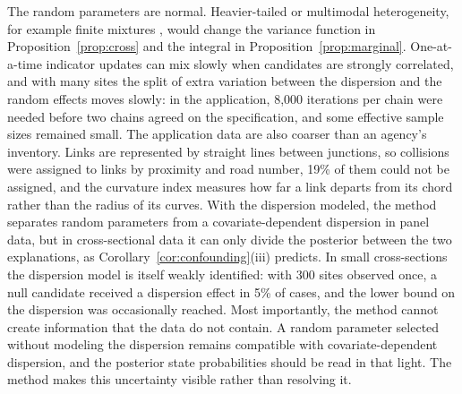 The random parameters are normal. Heavier-tailed or multimodal heterogeneity, for example finite mixtures \citep{buddhavarapu2016modeling}, would change the variance function in Proposition~\ref{prop:cross} and the integral in Proposition~\ref{prop:marginal}. One-at-a-time indicator updates can mix slowly when candidates are strongly correlated, and with many sites the split of extra variation between the dispersion and the random effects moves slowly: in the application, 8{,}000 iterations per chain were needed before two chains agreed on the specification, and some effective sample sizes remained small. The application data are also coarser than an agency's inventory. Links are represented by straight lines between junctions, so collisions were assigned to links by proximity and road number, 19\% of them could not be assigned, and the curvature index measures how far a link departs from its chord rather than the radius of its curves. With the dispersion modeled, the method separates random parameters from a covariate-dependent dispersion in panel data, but in cross-sectional data it can only divide the posterior between the two explanations, as Corollary~\ref{cor:confounding}(iii) predicts. In small cross-sections the dispersion model is itself weakly identified: with 300 sites observed once, a null candidate received a dispersion effect in 5\% of cases, and the lower bound on the dispersion was occasionally reached. Most importantly, the method cannot create information that the data do not contain. A random parameter selected without modeling the dispersion remains compatible with covariate-dependent dispersion, and the posterior state probabilities should be read in that light. The method makes this uncertainty visible rather than resolving it.
